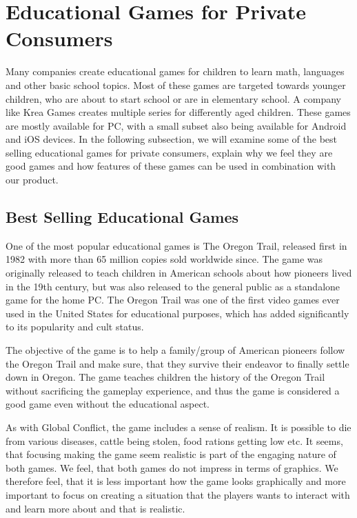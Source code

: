 \section{Educational Games for Private Consumers}
\label{sec:privateconsumers}
Many companies create educational games for children to learn math, languages and other basic school topics.
Most of these games are targeted towards younger children, who are about to start school or are in elementary school.
A company like Krea Games \cite{kreagames} creates multiple series for differently aged children.
These games are mostly available for PC, with a small subset also being available for Android and iOS devices.
In the following subsection, we will examine some of the best selling educational games for private consumers, explain why we feel they are good games and how features of these games can be used in combination with our product.

\subsection{Best Selling Educational Games}
One of the most popular educational games is The Oregon Trail, released first in 1982 with more than 65 million copies sold worldwide since.\cite{oregontrail} The game was originally released to teach children in American schools about how pioneers lived in the 19th century, but was also released to the general public as a standalone game for the home PC. The Oregon Trail was one of the first video games ever used in the United States for educational purposes, which has added  significantly to its popularity and cult status.

The objective of the game is to help a family/group of American pioneers follow the Oregon Trail and make sure, that they survive their endeavor to finally settle down in Oregon. The game teaches children the history of the Oregon Trail without sacrificing the gameplay experience, and thus the game is considered a good game even without the educational aspect.\newline

 As with Global Conflict, the game includes a sense of realism. It is possible to die from various diseases, cattle being stolen, food rations getting low etc. It seems, that focusing making the game seem realistic is part of the engaging nature of both games. We feel, that both games do not impress in terms of graphics. We therefore feel, that it is less important how the game looks graphically and more important to focus on creating a situation that the players wants to interact with and learn more about and that is realistic.\newline

